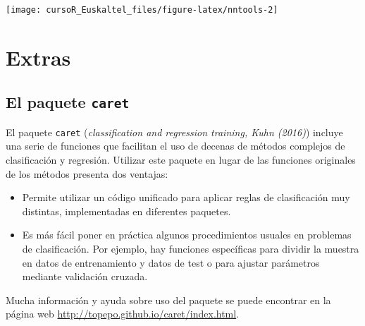 \documentclass[]{book}
\begin{document}
\begin{center}\texttt{[image: cursoR\_Euskaltel\_files/figure-latex/nntools-2]} \end{center}

\chapter{Extras}\label{extras}

\section{\texorpdfstring{El paquete
\texttt{caret}}{El paquete caret}}\label{el-paquete-caret}

El paquete \texttt{caret} (\emph{classification and regression training,
Kuhn (2016)}) incluye una serie de funciones que facilitan el uso de
decenas de métodos complejos de clasificación y regresión. Utilizar este
paquete en lugar de las funciones originales de los métodos presenta dos
ventajas:

\begin{itemize}
\item
  Permite utilizar un código unificado para aplicar reglas de
  clasificación muy distintas, implementadas en diferentes paquetes.
\item
  Es más fácil poner en práctica algunos procedimientos usuales en
  problemas de clasificación. Por ejemplo, hay funciones específicas
  para dividir la muestra en datos de entrenamiento y datos de test o
  para ajustar parámetros mediante validación cruzada.
\end{itemize}

Mucha información y ayuda sobre uso del paquete se puede encontrar en la
página web \url{http://topepo.github.io/caret/index.html}.


\end{document}
